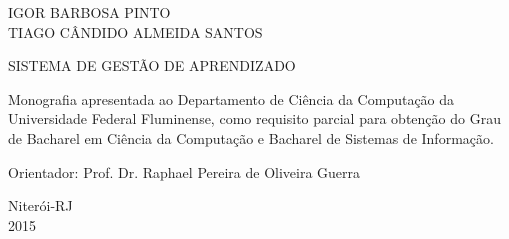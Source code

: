 

\begin{center}

IGOR BARBOSA PINTO\\
TIAGO CÂNDIDO ALMEIDA SANTOS

\vfill

SISTEMA DE GESTÃO DE APRENDIZADO

\vspace{3.0cm}

\begin{flushright}
\begin{minipage}{0.50\textwidth}

Monografia apresentada ao Departamento\linebreak
de Ciência da Computação da Universidade \linebreak
Federal Fluminense, como requisito parcial \linebreak
para obtenção do Grau de Bacharel em \linebreak
Ciência da Computação e \linebreak Bacharel de Sistemas de Informação.

\end{minipage}
\end{flushright}

\vspace{3.0cm}

Orientador: Prof. Dr. Raphael Pereira de Oliveira Guerra

\vfill

Niterói-RJ\\2015

\end{center}

\newpage
